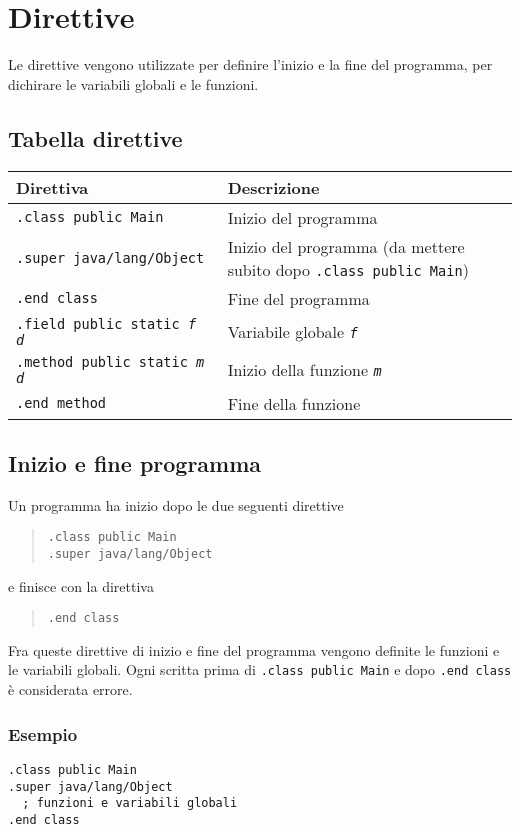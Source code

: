 \section{Direttive}
\label{sec:direttive}
Le direttive vengono utilizzate per definire l'inizio e la fine del programma, per dichirare le variabili globali e le funzioni.

\subsection{Tabella direttive}
\label{sec:tabella_direttive}
{\footnotesize
\begin{tabularx}{\columnwidth}{l X}
\toprule
\rowcolor[gray]{0.9}
  \textbf{Direttiva} &
  \textbf{Descrizione} \\
\toprule
  \texttt{.class~public Main} &
  Inizio del programma \\
\midrule
  \texttt{.super~java/lang/Object} &
  Inizio del programma (da mettere subito dopo \texttt{.class~public Main}) \\
\midrule
  \texttt{.end~class} &
  Fine del programma \\
\midrule
  \texttt{.field public static \textit{f} \textit{d}} &
  Variabile globale \texttt{\textit{f}} \\
\midrule
  \texttt{.method public static \textit{m} \textit{d}} &
  Inizio della funzione \texttt{\textit{m}} \\
\midrule
  \texttt{.end method} &
  Fine della funzione \\
\bottomrule
\end{tabularx}
} %

\subsection{Inizio e fine programma}
Un programma ha inizio dopo le due seguenti direttive
\begin{quote}
  \texttt{.class public Main} \\
  \texttt{.super java/lang/Object}
\end{quote}
e finisce con la direttiva
\begin{quote}
  \texttt{.end class}
\end{quote}
Fra queste direttive di inizio e fine del programma vengono definite le funzioni e le variabili globali. Ogni scritta prima di \texttt{.class~public Main} e dopo \texttt{.end~class} \`e considerata errore.
\subsubsection*{Esempio}
\begin{verbatim}
.class public Main
.super java/lang/Object
  ; funzioni e variabili globali
.end class
\end{verbatim}

